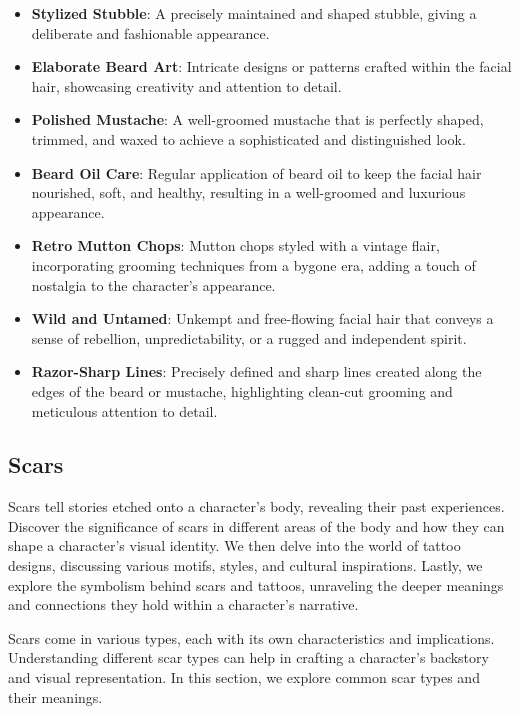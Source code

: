 \begin{itemize}
    \item \textbf{Stylized Stubble}: A precisely maintained and shaped stubble, giving a deliberate and fashionable appearance.
    \item \textbf{Elaborate Beard Art}: Intricate designs or patterns crafted within the facial hair, showcasing creativity and attention to detail.
    \item \textbf{Polished Mustache}: A well-groomed mustache that is perfectly shaped, trimmed, and waxed to achieve a sophisticated and distinguished look.
    \item \textbf{Beard Oil Care}: Regular application of beard oil to keep the facial hair nourished, soft, and healthy, resulting in a well-groomed and luxurious appearance.
    \item \textbf{Retro Mutton Chops}: Mutton chops styled with a vintage flair, incorporating grooming techniques from a bygone era, adding a touch of nostalgia to the character's appearance.
    \item \textbf{Wild and Untamed}: Unkempt and free-flowing facial hair that conveys a sense of rebellion, unpredictability, or a rugged and independent spirit.
    \item \textbf{Razor-Sharp Lines}: Precisely defined and sharp lines created along the edges of the beard or mustache, highlighting clean-cut grooming and meticulous attention to detail.
\end{itemize}

\subsection{\textbf{Scars}}

Scars tell stories etched onto a character's body, revealing their past experiences. Discover the significance of scars in different areas of the body and how they can shape a character's visual identity. We then delve into the world of tattoo designs, discussing various motifs, styles, and cultural inspirations. Lastly, we explore the symbolism behind scars and tattoos, unraveling the deeper meanings and connections they hold within a character's narrative.

Scars come in various types, each with its own characteristics and implications. Understanding different scar types can help in crafting a character's backstory and visual representation. In this section, we explore common scar types and their meanings.

